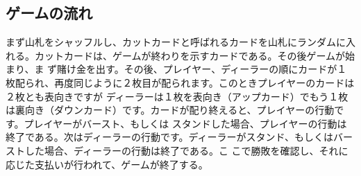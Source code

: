 \subsection{ゲームの流れ}
まず山札をシャッフルし、カットカードと呼ばれるカードを山札にランダムに入れる。カットカードは、ゲームが終わりを示すカードである。その後ゲームが始まり、ま
ず賭け金を出す。その後、プレイヤー、ディーラーの順にカードが１枚配られ、再度同じように２枚目が配られます。このときプレイヤーのカードは２枚とも表向きですが
ディーラーは１枚を表向き（アップカード）でもう１枚は裏向き（ダウンカード）です。カードが配り終えると、プレイヤーの行動です。プレイヤーがバースト、もしくは
スタンドした場合、プレイヤーの行動は終了である。次はディーラーの行動です。ディーラーがスタンド、もしくはバーストした場合、ディーラーの行動は終了である。こ
こで勝敗を確認し、それに応じた支払いが行われて、ゲームが終了する。